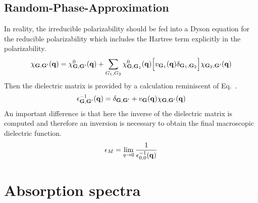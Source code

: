 \subsection{Random-Phase-Approximation}
In reality, the irreducible polarizability should be fed into a Dyson equation for the reducible polarizability which includes the Hartree term explicitly in the polarizability.
\begin{align}
    \chi_{\mathbf{G},\mathbf{G}'}(\mathbf{q})=\chi^0_{\mathbf{G},\mathbf{G}'}(\mathbf{q})+\sum_{G_1,G_2}\chi^0_{\mathbf{G},\mathbf{G}_1}(\mathbf{q})\Big[v_{\mathbf{G}_1}(\mathbf{q})\delta_{\mathbf{G}_1,\mathbf{G}_2}\Big]\chi_{\mathbf{G}_2,\mathbf{G}'}(\mathbf{q})
\end{align}
Then the dielectric matrix is provided by a calculation reminiscent of Eq.~\cite{app:eq:dielectric}.
\begin{align}
    \epsilon^{-1}_{\mathbf{G},\mathbf{G}'}(\mathbf{q})=
    \delta_{\mathbf{G},\mathbf{G}'}+v_{\mathbf{G}}(\mathbf{q})\chi_{\mathbf{G},\mathbf{G}'}(\mathbf{q})
\end{align}
An important difference is that here the inverse of the dielectric matrix is computed and therefore an inversion is necessary to obtain the final macroscopic dielectric function.
\begin{align}
    \epsilon_{M}=\lim_{q\rightarrow 0} \frac{1}{\epsilon^{-1}_{0,0}(\mathbf{q})}
\end{align}


\section{Absorption spectra}

